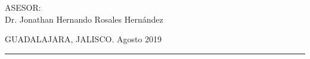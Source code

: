 \begin{titlepage}
\begin{center}
        {\scriptsize ASESOR:\\ Dr. Jonathan Hernando Rosales Hernández}
        
        \vspace*{1.2cm}
        
        {\scriptsize GUADALAJARA, JALISCO. Agosto 2019 }
        \rule{\textwidth}{4pt}\vspace*{-\baselineskip}\vspace*{2pt} %
    \end{center}
\end{titlepage}